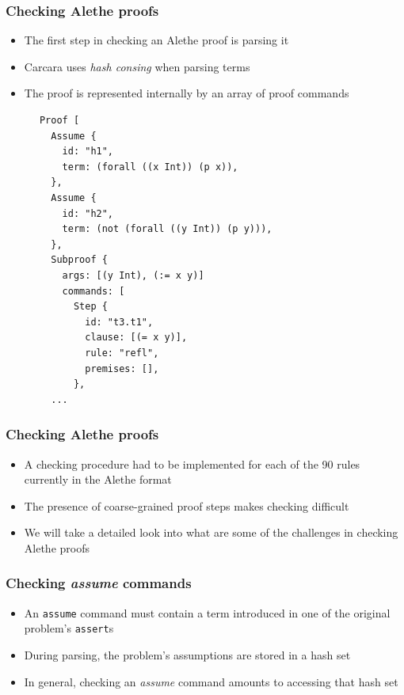 \documentclass[usepdftitle=false,aspectratio=169]{beamer}
\newcommand\vitem{\vfill\item}
\begin{document}
\begin{frame}[fragile]
  \frametitle{Checking Alethe proofs}
  \begin{minipage}[c][0.6 \textheight]{0.49 \textwidth}
  \begin{itemize}
    \item The first step in checking an Alethe proof is parsing it
    \vitem Carcara uses \textit{hash consing} when parsing terms
    \vitem The proof is represented internally by an array of proof commands
  \end{itemize}
  \end{minipage}
  \begin{minipage}{0.5 \textwidth}
    \vspace{-.35ex}
    \begin{verbatim}
      Proof [
        Assume {
          id: "h1",
          term: (forall ((x Int)) (p x)),
        },
        Assume {
          id: "h2",
          term: (not (forall ((y Int)) (p y))),
        },
        Subproof {
          args: [(y Int), (:= x y)]
          commands: [
            Step {
              id: "t3.t1",
              clause: [(= x y)],
              rule: "refl",
              premises: [],
            },
        ...
    \end{verbatim}
  \end{minipage}
\end{frame}

\begin{frame}
  \frametitle{Checking Alethe proofs}
  \begin{itemize}
    \item A checking procedure had to be implemented for each of the 90 rules
    currently in the Alethe format
    \vitem The presence of coarse-grained proof steps makes checking difficult
    \vitem We will take a detailed look into what are some of the challenges in
    checking Alethe proofs
  \end{itemize}
\end{frame}

\begin{frame}
  \frametitle{Checking \textit{assume} commands}
  \begin{itemize}
    \item An \texttt{assume} command must contain a term introduced in one of the
    original problem's \texttt{assert}s
    \vitem During parsing, the problem's assumptions are stored in a hash set
    \vitem In general, checking an \textit{assume} command amounts to accessing
    that hash set
  \end{itemize}
\end{frame}
\end{document}
